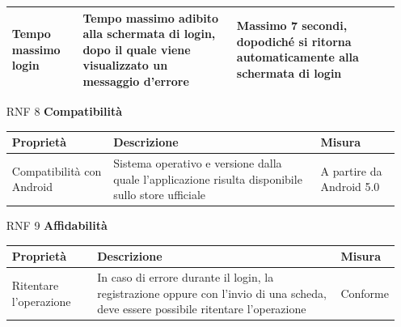 \documentclass{article}
\begin{document}
\begin{itemize}
\begin{tabular}{|p{5cm}|p{10cm}|p{3cm}|}
                     \hline
                     Tempo massimo login & Tempo massimo adibito alla schermata di login, dopo il quale viene visualizzato un messaggio d’errore &
                     Massimo 7 secondi, dopodiché si ritorna automaticamente alla schermata di login\\
                     \hline
                 \end{tabular}
   \item [RNF 8] \textbf{Compatibilità}\\
                 \begin{tabular}{|p{5cm}|p{11cm}|p{2cm}|}
                     \hline
                     Proprietà & Descrizione & Misura\\
                     \hline
                     Compatibilità con Android & Sistema operativo e versione dalla quale l’applicazione risulta disponibile sullo store ufficiale &
                     A partire da Android 5.0\\
                     \hline
                 \end{tabular}
   \item [RNF 9] \textbf{Affidabilità}\\
                 \begin{tabular}{|p{5cm}|p{10cm}|p{3cm}|}
                    \hline
                     Proprietà & Descrizione & Misura\\
                    \hline
                    Ritentare l’operazione&In caso di errore durante il login, la registrazione oppure con l’invio di una scheda, deve essere possibile ritentare l’operazione&Conforme\\
                    \hline
                 \end{tabular}
\end{itemize}
\end{document}
